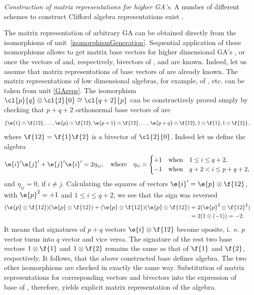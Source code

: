 \begin{unit}\textit{Construction of matrix representations for higher GA's}.\label{constructionOfRepresentation}
A number of different schemes to construct Clifford algebra
representations exist \cite{HILE199051,Poole1982,Ablamowicz2014}.

The matrix representation of arbitrary  GA can be obtained
directly from the isomorphisms of unit~\ref{isomorphismGeneration}.
Sequential application of these isomorphisms allows to get matrix base vectors for higher
dimensional GA's ,  or  once
the vectors of  and, respectively, bivectors of
,  and  are known. Indeed, let us
assume that matrix representations of base vectors of 
are already known. The matrix representations of low dimensional
algebras, for example, of , etc. can be taken from unit
\ref{GAreps}. The isomorphism
$\cl{p}{q}\otimes\cl{2}{0}\cong\cl{q+2}{p}$  can be constructively
proved simply by checking that $p+q+2$ orthonormal base vectors of
 are
\begin{equation*}
\{\e{1}\otimes\f{12},\dotsc,\e{p}\otimes\f{12},\e{p+1}\otimes\f{12},\dotsc,\e{p+q}\otimes\f{12},
1\otimes\f{1},1\otimes\f{2}\}\,,
\end{equation*}
where $\f{12}=\f{1}\f{2}$ is a bivector of $\cl{2}{0}$. Indeed let
us define the  algebra
\begin{equation*}
\e{i}^\prime\e{j}^\prime+\e{j}^\prime\e{i}^\prime=2\eta_{ij},\quad \textrm{where}\quad
\eta_{ii} =
\begin{cases}
+1 &\mbox{when}\quad 1\le i \le q+2, \\
-1 &\mbox{when}\quad q+2<i\le p+q+2,
\end{cases}
\end{equation*}
and $\eta_{ij}=0$, if $i\neq j$. Calculating the squares of
vectors $\e{i}^\prime=\e{p}\otimes\f{12}$, with $\e{p}^2=+1$ and
$1\le i\le q+2$, we see that the sign was reversed
\begin{equation*}
\begin{split}
(\e{p}\otimes\f{12})(\e{p}\otimes\f{12})+(\e{p}\otimes\f{12})(\e{p}\otimes\f{12})&=2(\e{p}^2\otimes\f{12}^2)\\
&=2(1\otimes(-1))=-2.
\end{split}
\end{equation*}
It means that signatures of $p+q$ vectors $\e{i}\otimes\f{12}$
become oposite, i.~e. $p$ vector turns into $q$ vector and vice
versa. The signature of the rest two base vectors $1\otimes\f{1}$
and $1\otimes\f{2}$ remains the same as that of  $\f{1}$ and
$\f{2}$, respectively. It follows, that the above constructed base
defines  algebra. The two other isomorphisms are
checked in exactly the same way. Substitution of matrix
representations for corresponding vectors and bivectors into the
expression of base of , therefore, yields explicit
matrix representation of the algebra.
\end{unit}
